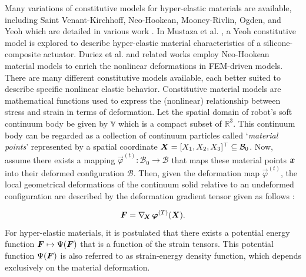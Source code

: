 Many variations of constitutive models for hyper-elastic materials are available, including Saint Venant-Kirchhoff, Neo-Hookean, Mooney-Rivlin, Ogden, and Yeoh  which are detailed in various work \cite{Meyer2009,Renaud2011,Kim2018}. In Mustaza et al. \cite{Mustaza2019}, a Yeoh constitutive model is explored to describe hyper-elastic material characteristics of a silicone-composite actuator. Duriez et al. \cite{Duriez2013} and related works \cite{Coevoet2017,Largilliere2015} employ Neo-Hookean material models to enrich the nonlinear deformations in FEM-driven models. There are many different constitutive models available, each better suited to describe specific nonlinear elastic behavior. Constitutive material models are mathematical functions used to express the (nonlinear) relationship between stress and strain in terms of deformation.  Let the spatial domain of robot's soft continuum body be given by $\mathbb{V}$ which is a compact subset of $\mathbb{R}^3$. This continuum body can be regarded as a collection of continuum particles called `\textit{material points}' represented by a spatial coordinate ${\boldsymbol{X}} = [X_1, X_2, X_3]^\top \subseteq \mathcal{B}_0$. Now, assume there exists a mapping $\vec{\varphi}^{(t)}: \mathcal{B}_0 \to \mathcal{B}$ that maps these material points ${\boldsymbol{x}}$ into their deformed configuration $\mathcal{B}$. Then, given the deformation map $\vec{\varphi}^{(t)}$, the local geometrical deformations of the continuum solid relative to an undeformed configuration are described by the deformation gradient tensor given as follows \cite{Holzapfel2002,Kim2018}: \vspace{-3mm}

\begin{equation}
\boldsymbol{F} = \nabla_{\!{\boldsymbol{X}}}\,\boldsymbol{\varphi}^{(T)}({\boldsymbol{X}}).
\end{equation}
%
For hyper-elastic materials, it is postulated that there exists a potential energy function $\boldsymbol{F} \mapsto \Psi(\boldsymbol{F})$ that is a function of the strain tensors. This potential function $\Psi(\boldsymbol{F})$ is also referred to as strain-energy density function, which depends exclusively on the material deformation.


